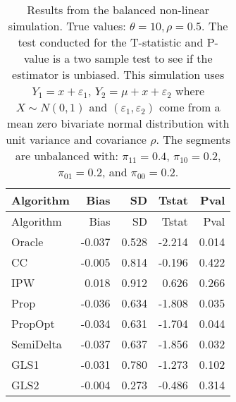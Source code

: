 \documentclass[
  letterpaper,
  DIV=11,
  numbers=noendperiod]{scrartcl}
\begin{document}
\begin{longtable}[]{@{}lrrrr@{}}
\caption{Results from the balanced non-linear simulation. True values:
\(\theta = 10, \rho = 0.5\). The test conducted for the T-statistic and
P-value is a two sample test to see if the estimator is unbiased. This
simulation uses \(Y_1 = x + \varepsilon_1\),
\(Y_2 = \mu + x + \varepsilon_2\) where \(X \sim N(0, 1)\) and
\((\varepsilon_1, \varepsilon_2)\) come from a mean zero bivariate
normal distribution with unit variance and covariance \(\rho\). The
segments are unbalanced with: \(\pi_{11} = 0.4\), \(\pi_{10} = 0.2\),
\(\pi_{01} = 0.2\), and \(\pi_{00} = 0.2\). }\tabularnewline
\toprule\noalign{}
Algorithm & Bias & SD & Tstat & Pval \\
\midrule\noalign{}
\endfirsthead
\toprule\noalign{}
Algorithm & Bias & SD & Tstat & Pval \\
\midrule\noalign{}
\endhead
\bottomrule\noalign{}
\endlastfoot
Oracle & -0.037 & 0.528 & -2.214 & 0.014 \\
CC & -0.005 & 0.814 & -0.196 & 0.422 \\
IPW & 0.018 & 0.912 & 0.626 & 0.266 \\
Prop & -0.036 & 0.634 & -1.808 & 0.035 \\
PropOpt & -0.034 & 0.631 & -1.704 & 0.044 \\
SemiDelta & -0.037 & 0.637 & -1.856 & 0.032 \\
GLS1 & -0.031 & 0.780 & -1.273 & 0.102 \\
GLS2 & -0.004 & 0.273 & -0.486 & 0.314 \\
\end{longtable}
\end{document}

